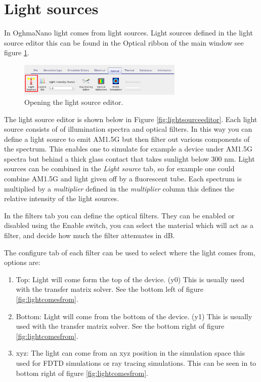\section{Light sources}
In OghmaNano light comes from light sources.  Light sources defined in the light source editor this can be found in the Optical ribbon of the main window see figure \ref{fig:opticalribbon}.

\begin{figure}[H]
\centering
\includegraphics[width=0.7\textwidth]{./images/light_ribbon.png}
\caption{Opening the light source editor.}
\label{fig:opticalribbon}
\end{figure}

The light source editor is shown below in Figure \ref{fig:lightsourceeditor}. Each light source consists of of illumination spectra and optical filters. In this way you can define a light source to emit AM1.5G but then filter out various components of the spectrum.  This enables one to simulate for example a device under AM1.5G spectra but behind a thick glass contact that takes sunlight below 300 nm. Light sources can be combined in the \emph{Light source} tab, so for example one could combine AM1.5G and light given off by a fluorescent tube. Each spectrum is multiplied by a \emph{multiplier} defined in the \emph{multiplier} column this defines the relative intensity of the light sources.

In the filters tab you can define the optical filters. They can be enabled or disabled using the Enable switch, you can select the material which will act as a filter, and decide how much the filter attenuates in dB.

The configure tab of each filter can be used to select where the light comes from, options are:

\begin{enumerate}
  \item Top: Light will come form the top of the device. (y0) This is usually used with the transfer matrix solver. See the bottom left of figure \ref{fig:lightcomesfrom}.
  \item Bottom: Light will come from the bottom of the device. (y1)  This is usually used with the transfer matrix solver.  See the bottom right of figure \ref{fig:lightcomesfrom}.
  \item xyz: The light can come from an xyz position in the simulation space this used for FDTD simulations or ray tracing simulations.  This can be seen in to bottom right of figure \ref{fig:lightcomesfrom}.
\end{enumerate}

